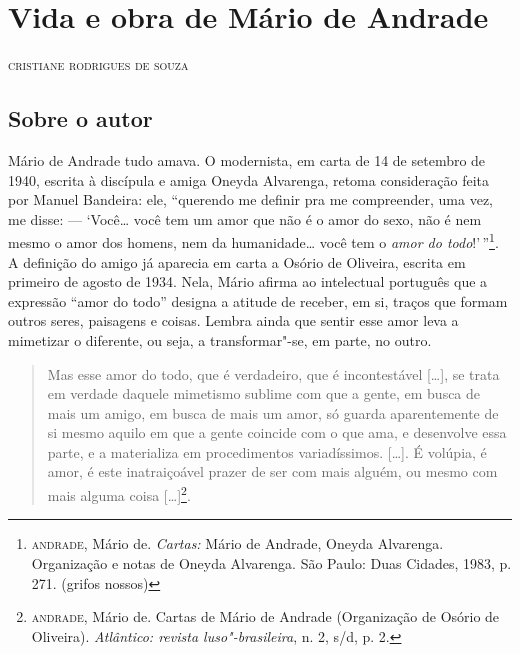 \chapter{Vida e obra de Mário de Andrade}

\begin{flushright}
\textsc{cristiane rodrigues de souza}
\end{flushright}
\bigskip

\section{Sobre o autor}

\noindent{}Mário de Andrade tudo amava. O modernista, em carta de 14 de setembro de
1940, escrita à discípula e amiga Oneyda Alvarenga, retoma consideração
feita por Manuel Bandeira: ele, ``querendo me definir pra me
compreender, uma vez, me disse: --- `Você\ldots{} você tem um amor que não é o
amor do sexo, não é nem mesmo o amor dos homens, nem da humanidade\ldots{}
você tem o \emph{amor do todo}!'\,''\footnote{\textsc{andrade}, Mário de.
  \emph{Cartas:} Mário de Andrade, Oneyda Alvarenga. Organização
  e notas de Oneyda Alvarenga. São Paulo: Duas Cidades, 1983, p. 271.
  (grifos nossos)}. A definição do amigo já aparecia em carta a Osório
de Oliveira, escrita em primeiro de agosto de 1934. Nela, Mário afirma
ao intelectual português que a expressão ``amor do todo'' designa a
atitude de receber, em si, traços que formam outros seres, paisagens e
coisas. Lembra ainda que sentir esse amor leva a mimetizar o diferente,
ou seja, a transformar"-se, em parte, no outro.

\begin{quote}
Mas esse amor do todo, que é verdadeiro, que é incontestável {[}\ldots{}{]},
se trata em verdade daquele mimetismo sublime com que a gente, em busca
de mais um amigo, em busca de mais um amor, só guarda aparentemente de
si mesmo aquilo em que a gente coincide com o que ama, e desenvolve essa
parte, e a materializa em procedimentos variadíssimos. {[}\ldots{}{]}. É
volúpia, é amor, é este inatraiçoável prazer de ser com mais alguém, ou
mesmo com mais alguma coisa {[}\ldots{}{]}\footnote{\textsc{andrade}, Mário de. Cartas de Mário de Andrade (Organização de Osório de Oliveira).
  \emph{Atlântico: revista luso"-brasileira}, n. 2, s/d, p. 2.}.
\end{quote}

